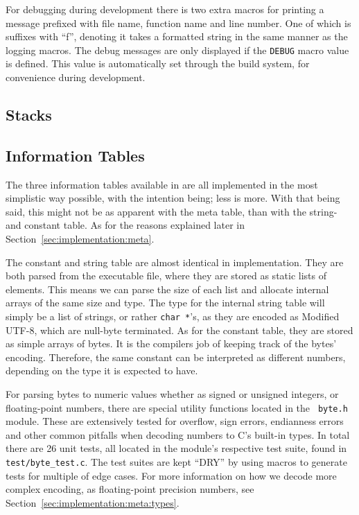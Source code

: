 For debugging during development there is two extra macros for printing a
message prefixed with file name, function name and line number. One of which is
suffixes with ``f'', denoting it takes a formatted string in the same manner as
the logging macros. The debug messages are only displayed if the {\tt DEBUG} macro value is
defined. This value is automatically set through the build system, for
convenience during development.

\subsection{Stacks}
\label{sec:implementation:stacks}


\subsection{Information Tables}
\label{sec:implementation:infotables}

The three information tables available in \thename{} are all implemented in the
most simplistic way possible, with the intention being; less is more. With that
being said, this might not be as apparent with the meta table, than with the
string- and constant table. As for the reasons explained later in
Section~\ref{sec:implementation:meta}.

The constant and string table are almost identical in implementation. They are
both parsed from the executable file, where they are stored as static lists of
elements. This means we can parse the size of each list and allocate internal
arrays of the same size and type. The type for the internal string table will
simply be a list of strings, or rather {\tt char *}'s, as they are encoded as
Modified UTF-8, which are null-byte terminated. As for the constant table, they
are stored as simple arrays of bytes. It is the compilers job of keeping track
of the bytes' encoding. Therefore, the same constant can be interpreted as
different numbers, depending on the type it is expected to have.

For parsing bytes to numeric values whether as signed or unsigned integers, or
floating-point numbers, there are special utility functions located in the {\tt
  byte.h} module. These are extensively tested for overflow, sign errors,
endianness errors and other common pitfalls when decoding numbers to C's
built-in types. In total there are 26 unit tests, all located in the module's
respective test suite, found in {\tt test/byte\_test.c}. The test suites are
kept ``DRY'' by using macros to generate tests for multiple of edge cases. For
more information on how we decode more complex encoding, as floating-point
precision numbers, see Section~\ref{sec:implementation:meta:types}.

